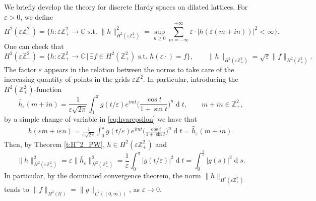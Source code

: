 \documentclass[12pt,a4paper,reqno]{amsart}
\theoremstyle{definition}
\theoremstyle{definition}\newtheorem{defn}[thm]{Definition}
\begin{document}
    We briefly develop the theory for discrete Hardy spaces on dilated lattices. For $\varepsilon>0$, we define
    \[
    H^2(\varepsilon\mathbb{Z}^2_+)=\{h\colon\varepsilon\mathbb{Z}^2_+\to\mathbb{C}\,\,\text{s.t.}\,\,\|h\|_{H^2(\varepsilon\mathbb{Z}^2_+)}^2=\sup_{n\geqslant 0}\sum_{m=-\infty}^{+\infty}\varepsilon\cdot|h(\varepsilon(m+in))|^2<\infty\}.
    \]
    One can check that
    \[
    H^2(\varepsilon\mathbb{Z}^2_+)=\{h\colon\varepsilon\mathbb{Z}^2_+\to\mathbb{C}\,|\,\exists f\in H^2(\mathbb{Z}^2_+)\,\,\text{s.t.}\,\,h(\varepsilon\cdot)=f\},\qquad \|h\|_{H^2(\varepsilon\mathbb{Z}^2_+)}=\sqrt{\varepsilon}\|f\|_{H^2(\mathbb{Z}^2_+)}.
    \]
    The factor $\varepsilon$ appears in the relation between the norms to take care of the increasing quantity of points in the grids $\varepsilon\mathbb{Z}^2$. In particular, introducing the $H^2(\mathbb{Z}^2_+)$-function
    \[
    \widetilde{h_\varepsilon}(m+in)=\frac{1}{\varepsilon\sqrt{2\pi}}\int_0^\pi g( t/\varepsilon)e^{imt}\Big(\frac{\cos t}{1+\sin t}\Big)^n \operatorname{d}\!t, \qquad m+in\in\mathbb{Z}^2_+,
    \]
    by a simple change of variable in \eqref{eq:hvarepsilon} we have that
    \begin{align*}
    h(\varepsilon m+i\varepsilon n)=
    \frac{1}{\varepsilon\sqrt{2\pi}}\int_0^\pi g( t/\varepsilon)e^{imt}\Big(\frac{\cos t}{1+\sin t}\Big)^n \operatorname{d}\!t=\widetilde{h_\varepsilon}(m+in).  
    \end{align*} 
    Then, by Theorem \ref{t:H^2_PW}, $h\in H^2(\varepsilon\mathbb{Z}^2_+)$ and
    \[
    \|h\|_{H^2(\varepsilon\mathbb{Z}^2_+)}^2=\varepsilon\|\widetilde{h_\varepsilon}\|_{H^2(\mathbb{Z}^2_+)}^2=\frac{1}{\varepsilon}\int_0^\pi |g(t/\varepsilon)|^2 \operatorname{d}\!t=\int_0^{\frac{\pi}{\varepsilon}} |g(s)|^2 \operatorname{d}\!s.
    \]
    In particular, by the dominated convergence theorem, the norm $\|h\|_{H^2(\varepsilon\mathbb{Z}^2_+)}$ tends to $\|f\|_{H^2(\mathcal{U})}=\|g\|_{L^2((0,\infty))}$, as $\varepsilon\to 0.$
    
\end{document}

